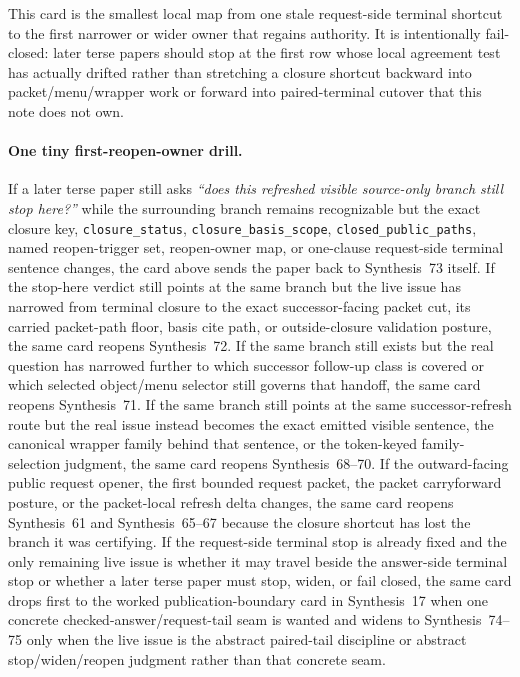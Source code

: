 \documentclass[11pt]{article}
\begin{document}
This card is the smallest local map from one stale request-side terminal shortcut to the first narrower or wider owner that regains authority. It is intentionally fail-closed: later terse papers should stop at the first row whose local agreement test has actually drifted rather than stretching a closure shortcut backward into packet/menu/wrapper work or forward into paired-terminal cutover that this note does not own.

\paragraph{One tiny first-reopen-owner drill.}
If a later terse paper still asks \emph{``does this refreshed visible source-only branch still stop here?''} while the surrounding branch remains recognizable but the exact closure key, \nolinkurl{closure_status}, \nolinkurl{closure_basis_scope}, \nolinkurl{closed_public_paths}, named reopen-trigger set, reopen-owner map, or one-clause request-side terminal sentence changes, the card above sends the paper back to Synthesis~73 itself. If the stop-here verdict still points at the same branch but the live issue has narrowed from terminal closure to the exact successor-facing packet cut, its carried packet-path floor, basis cite path, or outside-closure validation posture, the same card reopens Synthesis~72. If the same branch still exists but the real question has narrowed further to which successor follow-up class is covered or which selected object/menu selector still governs that handoff, the same card reopens Synthesis~71. If the same branch still points at the same successor-refresh route but the real issue instead becomes the exact emitted visible sentence, the canonical wrapper family behind that sentence, or the token-keyed family-selection judgment, the same card reopens Synthesis~68--70. If the outward-facing public request opener, the first bounded request packet, the packet carryforward posture, or the packet-local refresh delta changes, the same card reopens Synthesis~61 and Synthesis~65--67 because the closure shortcut has lost the branch it was certifying. If the request-side terminal stop is already fixed and the only remaining live issue is whether it may travel beside the answer-side terminal stop or whether a later terse paper must stop, widen, or fail closed, the same card drops first to the worked publication-boundary card in Synthesis~17 when one concrete checked-answer/request-tail seam is wanted and widens to Synthesis~74--75 only when the live issue is the abstract paired-tail discipline or abstract stop/widen/reopen judgment rather than that concrete seam.\cite{series:publicrequestnotices,series:publicrequestresponsepackets,series:publicrequestresponsepacketcarryforward,series:publicrequestresponsepacketdeltas,series:publicrequestresponsepacketrefreshnotices,series:publicrequestresponsepacketrefreshnoticenormalforms,series:publicrequestresponsepacketrefreshnoticeselections,series:publicrequestresponsepacketrefreshresponsemenus,series:publicrequestresponsepacketrefreshresponsepackets,series:pairedterminalcitationdiscipline,series:pairedterminalcutoverrule,series:workedexample}
\end{document}
